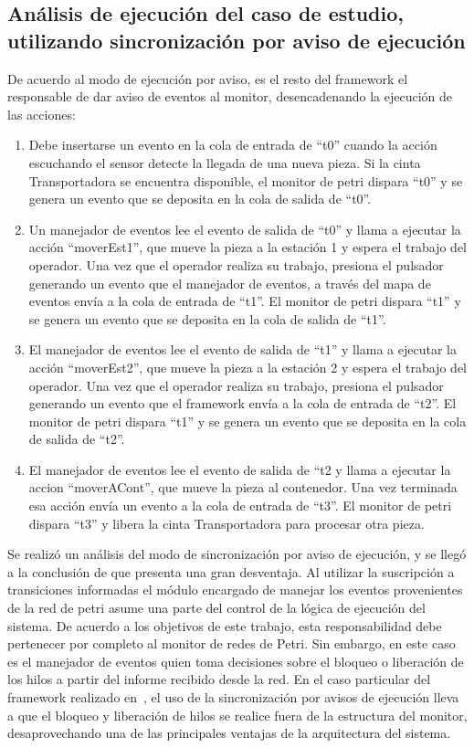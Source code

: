 \subsection{Análisis de ejecución del caso de estudio, utilizando
sincronización por aviso de ejecución} 
De acuerdo al modo de ejecución por aviso, es el resto del framework el
responsable de dar aviso de eventos al monitor, desencadenando la ejecución de las acciones:
\begin{enumerate}
    \item Debe insertarse un evento en la cola de entrada de “t0” cuando la
    acción escuchando el sensor detecte la llegada de una nueva pieza. Si la
    cinta Transportadora se encuentra disponible, el monitor de petri dispara
    “t0” y se genera un evento que se deposita en la cola de salida de “t0”.
    \item Un manejador de eventos lee el evento de salida de “t0” y llama a
    ejecutar la acción “moverEst1”, que mueve la pieza a la estación 1 y espera
    el trabajo del operador. Una vez que el operador realiza su trabajo,
    presiona el pulsador generando un evento que el manejador de eventos, a través del
    mapa de eventos envía a la cola de entrada de “t1”. El monitor de petri
    dispara “t1” y se genera un evento que se deposita en la cola de salida de
    “t1”.
    \item El manejador de eventos lee el evento de salida de “t1” y llama a
    ejecutar la acción “moverEst2”, que mueve la pieza a la estación 2 y espera
    el trabajo del operador. Una vez que el operador realiza su trabajo,
    presiona el pulsador generando un evento que el framework envía a la cola
    de  entrada de “t2”. El monitor de petri dispara “t1” y se genera un evento
    que se deposita en la cola de salida de “t2”.
    \item El manejador de eventos lee el evento de salida de “t2 y llama a
    ejecutar la accion “moverACont”, que mueve la pieza al contenedor. Una vez
    terminada esa acción envía un evento a la cola de entrada de “t3”. El
    monitor de petri dispara “t3” y libera la cinta Transportadora para procesar otra pieza.
\end{enumerate}

Se realizó un análisis del modo de sincronización por aviso de ejecución, y se
llegó a la conclusión de que presenta una gran desventaja.
Al utilizar la suscripción a transiciones informadas el módulo
encargado de manejar los eventos provenientes de la red de petri asume
una parte del control de la lógica de ejecución del sistema.
De acuerdo a los objetivos de este trabajo, esta responsabilidad debe pertenecer
por completo al monitor de redes de Petri. Sin embargo, en este caso es el
manejador de eventos quien toma decisiones sobre el bloqueo o liberación de los
hilos a partir del informe recibido desde la red. En el caso
particular del framework realizado en~\cite{chimp}, el uso de la sincronización
por avisos de ejecución lleva a que el bloqueo y liberación de hilos se realice
fuera de la estructura del monitor, desaprovechando una de las principales
ventajas de la arquitectura del sistema.
\\


